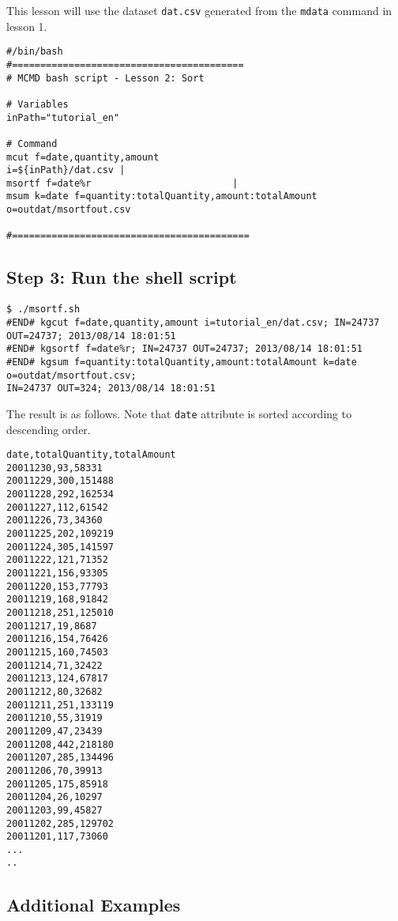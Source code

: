 This lesson will use the dataset \verb|dat.csv| generated from the \verb|mdata| command in lesson 1. 

\begin{verbatim}
#/bin/bash
#=========================================
# MCMD bash script - Lesson 2: Sort 

# Variables
inPath="tutorial_en"

# Command 
mcut f=date,quantity,amount                               i=${inPath}/dat.csv |
msortf f=date%r                         |       
msum k=date f=quantity:totalQuantity,amount:totalAmount       o=outdat/msortfout.csv

#==========================================
\end{verbatim}

\subsection{Step 3: Run the shell script }

\begin{verbatim}
$ ./msortf.sh 
#END# kgcut f=date,quantity,amount i=tutorial_en/dat.csv; IN=24737 OUT=24737; 2013/08/14 18:01:51
#END# kgsortf f=date%r; IN=24737 OUT=24737; 2013/08/14 18:01:51
#END# kgsum f=quantity:totalQuantity,amount:totalAmount k=date o=outdat/msortfout.csv; 
IN=24737 OUT=324; 2013/08/14 18:01:51
\end{verbatim}

\noindent
The result is as follows. Note that \verb|date| attribute is sorted according to descending order.  

\begin{verbatim}
date,totalQuantity,totalAmount
20011230,93,58331
20011229,300,151488
20011228,292,162534
20011227,112,61542
20011226,73,34360
20011225,202,109219
20011224,305,141597
20011222,121,71352
20011221,156,93305
20011220,153,77793
20011219,168,91842
20011218,251,125010
20011217,19,8687
20011216,154,76426
20011215,160,74503
20011214,71,32422
20011213,124,67817
20011212,80,32682
20011211,251,133119
20011210,55,31919
20011209,47,23439
20011208,442,218180
20011207,285,134496
20011206,70,39913
20011205,175,85918
20011204,26,10297
20011203,99,45827
20011202,285,129702
20011201,117,73060
...
..
\end{verbatim}

\subsection{Additional Examples}

